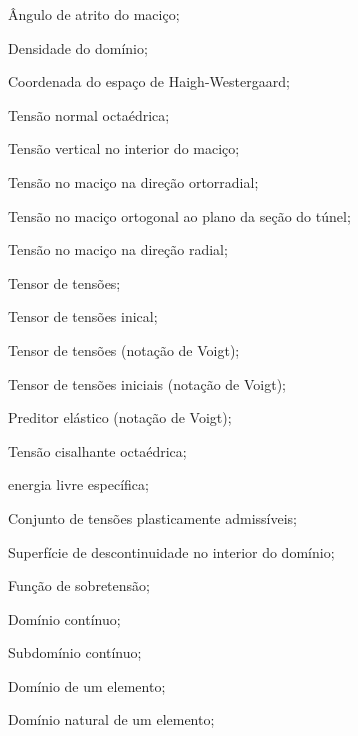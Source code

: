 \item[$ \phi $] 		Ângulo de atrito do maciço;
\item[$ \rho $] 		Densidade do domínio;
\item[$ \rho_{H} $] 		Coordenada do espaço de Haigh-Westergaard;

\item[$ \sigma_{oct} $] 	Tensão normal octaédrica;
\item[$ \sigma_{v} $] 	Tensão vertical no interior do maciço;
\item[$ \sigma_{\theta \theta} $] Tensão no maciço na direção ortorradial;
\item[$ \sigma_{zz} $] 	Tensão no maciço ortogonal ao plano da seção do túnel;
\item[$ \sigma_{rr} $] 	Tensão no maciço na direção radial;
\item[$ \sigmall $] 	Tensor de tensões;
\item[$ \sigmall_0 $] 	Tensor de tensões inical;
\item[$ \sigmal $] 	Tensor de tensões (notação de Voigt);
\item[$ \sigmal_0 $] 	Tensor de tensões iniciais (notação de Voigt);
\item[$ \sigmal^{trial} $] 	Preditor elástico (notação de Voigt);
\item[$ \tau_{oct} $] 	Tensão cisalhante octaédrica;
\item[$\psi$] energia livre específica;

\item[\textbf{Grego maiúsculo:}]
\item[$ \Gamma $]		Conjunto de tensões plasticamente admissíveis;
\item[$ \Sigma $]		Superfície de descontinuidade no interior do domínio;
\item[$ \Phi $]		Função de sobretensão;
\item[$ \Omega $] 		Domínio contínuo;
\item[$ \Omega' $] 		Subdomínio contínuo;
\item[$ \Omega_e $] 		Domínio de um elemento;
\item[$\Omega_\xi$] 		Domínio natural de um elemento;

